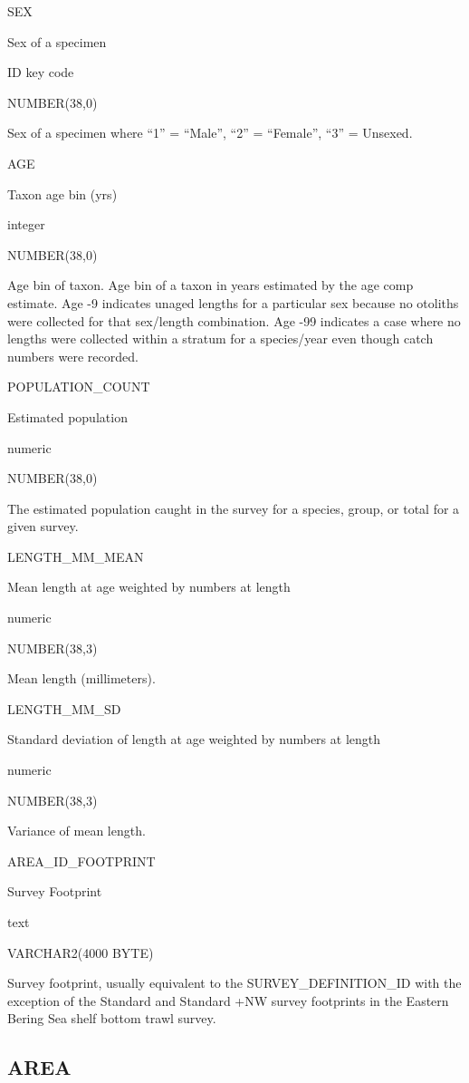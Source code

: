 \documentclass[
  letterpaper,
  oneside,
  open=any]{scrbook}
\begin{document}
SEX

Sex of a specimen

ID key code

NUMBER(38,0)

Sex of a specimen where ``1'' = ``Male'', ``2'' = ``Female'', ``3'' =
Unsexed.

AGE

Taxon age bin (yrs)

integer

NUMBER(38,0)

Age bin of taxon. Age bin of a taxon in years estimated by the age comp
estimate. Age -9 indicates unaged lengths for a particular sex because
no otoliths were collected for that sex/length combination. Age -99
indicates a case where no lengths were collected within a stratum for a
species/year even though catch numbers were recorded.

POPULATION\_COUNT

Estimated population

numeric

NUMBER(38,0)

The estimated population caught in the survey for a species, group, or
total for a given survey.

LENGTH\_MM\_MEAN

Mean length at age weighted by numbers at length

numeric

NUMBER(38,3)

Mean length (millimeters).

LENGTH\_MM\_SD

Standard deviation of length at age weighted by numbers at length

numeric

NUMBER(38,3)

Variance of mean length.

AREA\_ID\_FOOTPRINT

Survey Footprint

text

VARCHAR2(4000 BYTE)

Survey footprint, usually equivalent to the SURVEY\_DEFINITION\_ID with
the exception of the Standard and Standard +NW survey footprints in the
Eastern Bering Sea shelf bottom trawl survey.

\subsection{AREA}\label{area}
\end{document}
